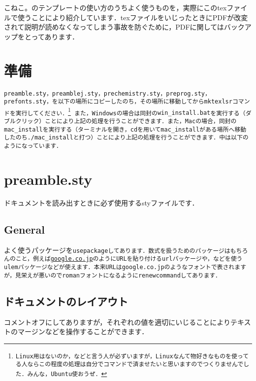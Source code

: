 \documentclass[a4paper, 9pt]{jsarticle}
\title{\sf{こねこ。のテンプレートver2.2使用方法}}
\author{\sf{こねこ。}}
\date{\sf{\today}}
\begin{document}
\maketitle
こねこ。のテンプレートの使い方のうちよく使うものを，実際にこのtexファイルで使うことにより紹介しています．texファイルをいじったときにPDFが改変されて説明が読めなくなってしまう事故を防ぐために，PDFに関してはバックアップをとってあります．\par 
\section{準備}
\tt{preamble.sty}，\tt{preamblej.sty}，\tt{prechemistry.sty}，\tt{preprog.sty}，\tt{prefonts.sty}，を以下の場所にコピーしたのち，その場所に移動してから\tt{mktexlsr}コマンドを実行してください．\footnote{Linux用はないのか，などと言う人が必ずいますが，Linuxなんて物好きなものを使ってる人ならこの程度の処理は自分でコマンドで済ませたいと思いますのでつくりませんでした．みんな，Ubuntu使おうぜ．}
また，Windowsの場合は同封の\tt{win\_install.bat}を実行する（ダブルクリック）ことにより上記の処理を行うことができます．また，Macの場合，同封の\tt{mac\_install}を実行する（ターミナルを開き，\tt{cd}を用いて\tt{mac\_install}がある場所へ移動したのち\tt{./mac\_install}と打つ）ことにより上記の処理を行うことができます．中は以下のようになっています．



\section{preamble.sty}
ドキュメントを読み出すときに必ず使用するstyファイルです．
\subsection{General}
よく使うパッケージを\tt{usepackage}してあります．数式を扱うためのパッケージはもちろんのこと，例えば\url{google.co.jp}のようにURLを貼り付ける\tt{url}パッケージや，などを使う\tt{ulem}パッケージなどが使えます．本来URLは\tt{google.co.jp}のようなフォントで表されますが，見栄えが悪いのでromanフォントになるように\tt{renewcommand}してあります．
\subsection{ドキュメントのレイアウト}
コメントオフにしてありますが，それぞれの値を適切にいじることによりテキストのマージンなどを操作することができます．
\end{document}
